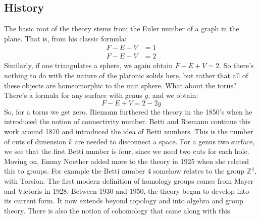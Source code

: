 \documentclass{book}                                                           %
\begin{document}
            \subsection{History}
                The basic root of the theory stems from the
                Euler number of a graph in the plane. That is,
                from his classic formula:
                \begin{align}
                    F-E+V&=1
                    \tag{Planar Graphs}\\
                    F-E+V&=2
                    \tag{Platonic Solids}
                \end{align}
                Similarly, if one triangulates a sphere, we again
                obtain $F-E+V=2$. So there's nothing to do with the
                nature of the platonic solids here, but rather that
                all of these objects are homeomorphic to the
                unit sphere. What about the torus? There's a formula
                for any surface with genus $g$, and we obtain:
                \begin{equation}
                    F-E+V=2-2g
                \end{equation}
                So, for a torus we get zero. Riemann furthered the
                theory in the 1850's when he introduced the notion of
                connectivity number. Betti and Riemann continue this
                work around 1870 and introduced the idea of Betti
                numbers. This is the number of cuts of dimension $k$
                are needed to disconnect a space. For a genus
                two surface, we see that the first Betti number is
                four, since we need two cuts for each hole. Moving on,
                Emmy Noether added more to the theory in 1925
                when she related this to groups. For example the
                Betti number 4 somehow relates to the group
                $\mathbb{Z}^{4}$, with Torsion. The first modern
                definition of homology groups comes from Mayer and
                Vietoris in 1928. Between 1930 and 1950, the theory
                began to develop into its current form. It now extends
                beyond topology and into algebra and group theory.
                There is also the notion of cohomology that came along
                with this.
\end{document}

